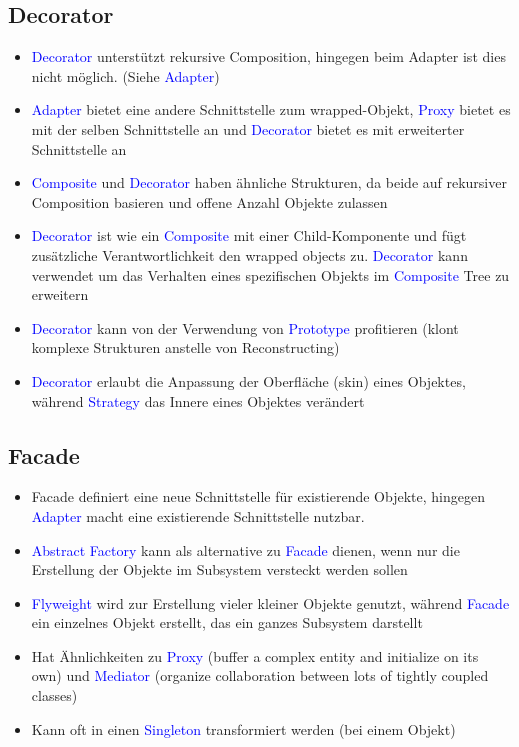 \subsection{Decorator}

\begin{itemize}
    \item \textcolor{blue}{Decorator} unterstützt rekursive Composition, hingegen beim Adapter ist dies nicht möglich. (Siehe \textcolor{blue}{Adapter})
    \item \textcolor{blue}{Adapter} bietet eine andere Schnittstelle zum wrapped-Objekt, \textcolor{blue}{Proxy} bietet es mit der selben Schnittstelle an und \textcolor{blue}{Decorator} bietet es mit erweiterter Schnittstelle an
    \item \textcolor{blue}{Composite} und \textcolor{blue}{Decorator} haben ähnliche Strukturen, da beide auf rekursiver Composition basieren und offene Anzahl Objekte zulassen
    \item \textcolor{blue}{Decorator} ist wie ein \textcolor{blue}{Composite} mit einer Child-Komponente und fügt zusätzliche Verantwortlichkeit den wrapped objects zu. \textcolor{blue}{Decorator} kann verwendet um das Verhalten eines spezifischen Objekts im \textcolor{blue}{Composite} Tree zu erweitern
    \item \textcolor{blue}{Decorator} kann von der Verwendung von \textcolor{blue}{Prototype} profitieren (klont komplexe Strukturen anstelle von Reconstructing)
    \item \textcolor{blue}{Decorator} erlaubt die Anpassung der Oberfläche (skin) eines Objektes, während \textcolor{blue}{Strategy} das Innere eines Objektes verändert
\end{itemize}

\subsection{Facade}

\begin{itemize}
    \item Facade definiert eine neue Schnittstelle für existierende Objekte, hingegen \textcolor{blue}{Adapter} macht eine existierende Schnittstelle nutzbar.
    \item \textcolor{blue}{Abstract Factory} kann als alternative zu \textcolor{blue}{Facade} dienen, wenn nur die Erstellung der Objekte im Subsystem versteckt werden sollen
    \item \textcolor{blue}{Flyweight} wird zur Erstellung vieler kleiner Objekte genutzt, während \textcolor{blue}{Facade} ein einzelnes Objekt erstellt, das ein ganzes Subsystem darstellt
    \item Hat Ähnlichkeiten zu \textcolor{blue}{Proxy} (buffer a complex entity and initialize on its own) und \textcolor{blue}{Mediator} (organize collaboration between lots of tightly coupled classes)
    \item Kann oft in einen \textcolor{blue}{Singleton} transformiert werden (bei einem Objekt)
\end{itemize}

